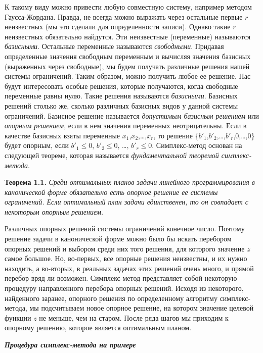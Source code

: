 \documentclass{article}
\begin{document}
К такому виду можно привести любую совместную систему, например методом Гаусса-Жордана. Правда, не всегда можно выражать через остальные первые $r$ неизвестных (мы это сделали для определенности записи). Однако такие $r$ неизвестных обязательно найдутся. Эти неизвестные (переменные) называются \textit{базисными}. Остальные переменные называются   \textit{свободными}. Придавая определенные значения свободным переменным и вычисляя значения базисных (выраженных через свободные), мы будем получать различные решения нашей системы ограничений. Таким образом, можно получить любое ее решение. Нас будут интересовать особые решения, которые  получаются, когда свободные переменные равны нулю. Такие решения  называются \textit{базисными}. Базисных решений столько же, сколько  различных  базисных видов у данной системы ограничений. Базисное решение называется \textit{допустимым базисным решением} или \textit{опорным решением}, если в нем значения переменных неотрицательны. Если в качестве базисных взяты переменные $x_1$,$x_2$,\dots,$x_r$, то решение \{$b'_1$,$b'_2$,\dots,$b'_r$,0,\dots,0\} будет опорным, если $b'_1 \leq 0$,    $b'_2 \leq 0$, \dots, $b'_r \leq 0$. Симплекс-метод основан на следующей теореме, которая называется \textit{фундаментальной теоремой симплекс-метода}. 

\textbf{Теорема 1.1.} \textit{Среди оптимальных планов задачи линейного программирования в канонической форме обязательно есть опорное решение ее системы ограничений. Если оптимальный план задачи единственен, то он совпадает с некоторым опорным  решением.}

Различных опорных решений системы ограничений конечное число. Поэтому решение задачи в канонической форме можно было бы искать  перебором опорных решений и выбором среди них того решения,  для  которого  значение $z$ самое большое. Но, во-первых, все опорные решения неизвестны, и их нужно находить, а во-вторых, в реальных задачах этих решений очень много, и прямой перебор вряд ли возможен. Симплекс-метод  представляет собой  некоторую  процедуру  направленного перебора опорных решений.  Исходя из некоторого, найденного заранее, опорного решения по определенному алгоритму симплекс-метода, мы подсчитываем новое опорное решение, на котором значение целевой функции $z$ не меньше, чем на старом. После ряда шагов мы приходим к опорному решению, которое является  оптимальным планом.
\begin{center}
\textit{\textbf{Процедура симплекс-метода на примере}}
\end{center}
\end{document}
